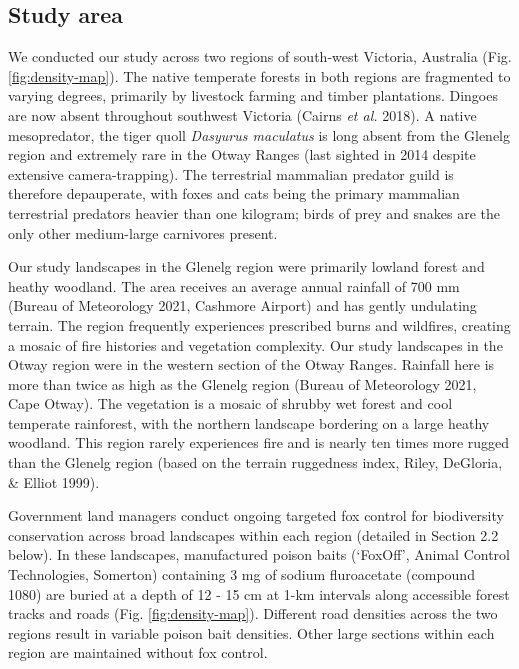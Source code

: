 \documentclass[preprint, 3p, authoryear]{elsarticle} %
\begin{document}
\hypertarget{study-area}{%
\subsection{Study area}\label{study-area}}

We conducted our study across two regions of south-west Victoria, Australia (Fig. \ref{fig:density-map}). The native temperate forests in both regions are fragmented to varying degrees, primarily by livestock farming and timber plantations. Dingoes are now absent throughout southwest Victoria (Cairns \emph{et al.} 2018). A native mesopredator, the tiger quoll \emph{Dasyurus maculatus} is long absent from the Glenelg region and extremely rare in the Otway Ranges (last sighted in 2014 despite extensive camera-trapping). The terrestrial mammalian predator guild is therefore depauperate, with foxes and cats being the primary mammalian terrestrial predators heavier than one kilogram; birds of prey and snakes are the only other medium-large carnivores present.

Our study landscapes in the Glenelg region were primarily lowland forest and heathy woodland. The area receives an average annual rainfall of 700 mm (Bureau of Meteorology 2021, Cashmore Airport) and has gently undulating terrain. The region frequently experiences prescribed burns and wildfires, creating a mosaic of fire histories and vegetation complexity. Our study landscapes in the Otway region were in the western section of the Otway Ranges. Rainfall here is more than twice as high as the Glenelg region (Bureau of Meteorology 2021, Cape Otway). The vegetation is a mosaic of shrubby wet forest and cool temperate rainforest, with the northern landscape bordering on a large heathy woodland. This region rarely experiences fire and is nearly ten times more rugged than the Glenelg region (based on the terrain ruggedness index, Riley, DeGloria, \& Elliot 1999).

Government land managers conduct ongoing targeted fox control for biodiversity conservation across broad landscapes within each region (detailed in Section 2.2 below). In these landscapes, manufactured poison baits (`FoxOff', Animal Control Technologies, Somerton) containing 3 mg of sodium fluroacetate (compound 1080) are buried at a depth of 12 - 15 cm at 1-km intervals along accessible forest tracks and roads (Fig. \ref{fig:density-map}). Different road densities across the two regions result in variable poison bait densities. Other large sections within each region are maintained without fox control.
\end{document}
